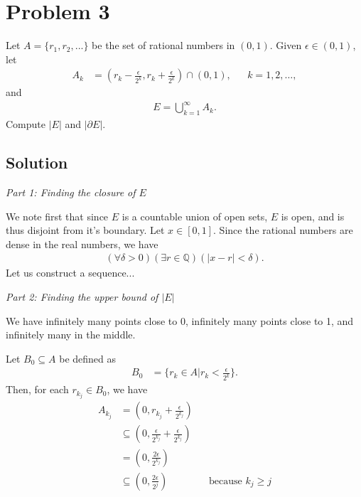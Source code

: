\documentclass[10pt,a4paper]{article}
\makeatletter
\theoremstyle{theorem}
\newcommand{\proofpart}[2]{%
  \par
  \addvspace{\medskipamount}%
  \noindent\emph{Part #1: #2}\par\nobreak
  \addvspace{\smallskipamount}%
  \@afterheading
}
\theoremstyle{definition}
\makeatother
\begin{document}
\section*{Problem 3}
Let $A = \{r_1, r_2, ...\}$ be the set of rational numbers in $(0, 1)$. Given $\epsilon \in (0, 1)$, let 
\begin{align*}
A_k &= (r_k - \frac{\epsilon}{2^k}, r_k + \frac{\epsilon}{2^k}) \cap (0, 1), &&k=1,2,\ldots,
\end{align*} 
and 
\begin{align*}
E = \bigcup_{k=1}^\infty A_k.
\end{align*}
Compute $|E|$ and $|\partial E|$.

\subsection*{Solution}
\proofpart{1}{Finding the closure of $E$}
We note first that since $E$ is a countable union of open sets, $E$ is open, and is thus disjoint from it's boundary. Let $x \in [0, 1]$. Since the rational numbers are dense in the real numbers, we have 
\begin{align*}
(\forall \delta > 0)(\exists r \in \mathbb{Q})(|x - r| < \delta).
\end{align*}
Let us construct a sequence...

\proofpart{2}{Finding the upper bound of $|E|$}
We have infinitely many points close to 0, infinitely many points close to 1, and infinitely many in the middle.

Let $B_0 \subseteq A$ be defined as
\begin{align*}
B_0 &= \{r_k \in A| r_k < \frac{\epsilon}{2^k} \}.
\end{align*}
Then, for each $r_{k_j} \in B_0$, we have
\begin{align*}
A_{k_j} &= (0, r_{k_j} + \frac{\epsilon}{2^{k_j}})\\
&\subseteq (0, \frac{\epsilon}{2^{k_j}} + \frac{\epsilon}{2^{k_j}})\\
&= (0, \frac{2 \epsilon}{2^{k_j}})\\
&\subseteq (0, \frac{2 \epsilon}{2^{j}}) &&\text{because } k_j \geq j
\end{align*}
\end{document}
